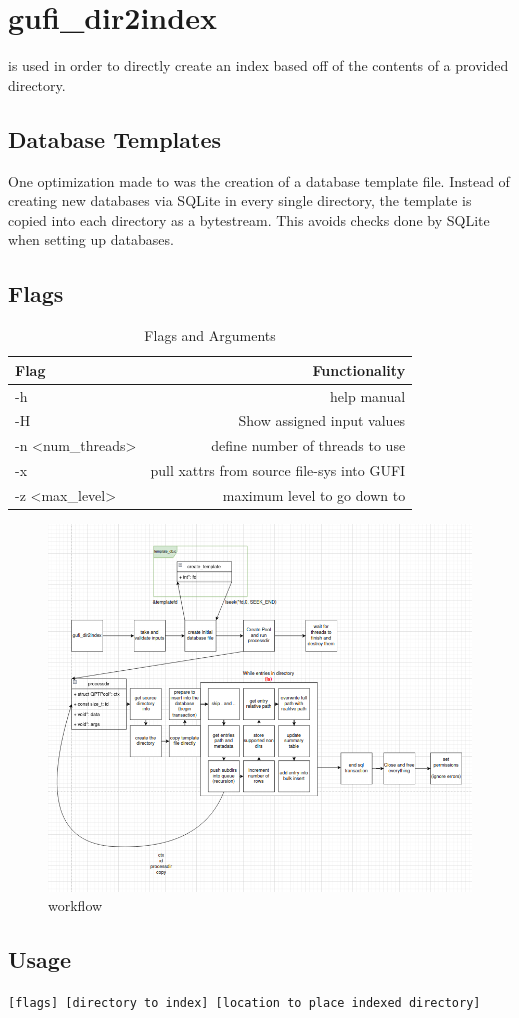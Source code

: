 \section{gufi\_dir2index}
\gufidirindex is used in order to directly create an index based off
of the contents of a provided directory.

\subsection{Database Templates}
One optimization made to \gufidirindex was the creation of a database
template file. Instead of creating new databases via SQLite in every
single directory, the template is copied into each directory as a
bytestream. This avoids checks done by SQLite when setting up databases.

\subsection{Flags}

\begin{table} [h]
  \centering
  \begin{tabular}{l|r}
    Flag & Functionality \\\hline
    -h & help manual \\
    -H & Show assigned input values \\
    -n \textless num\_threads\textgreater  & define number of threads to use \\
    -x & pull xattrs from source file-sys into GUFI \\
    -z \textless max\_level\textgreater & maximum level to go down to
  \end{tabular}
  \caption{\label{fig:Flags_for_dir2index} \gufidirindex Flags and Arguments}
\end{table}

\begin{figure} [h]
  \centering
  \includegraphics[width=1.0\textwidth]{images/gufi_dir2index.png}
  \caption{\label{fig:gufi_dir2index} \gufidirindex workflow}
\end{figure}

\subsection{Usage}
\gufidirindex \texttt{[flags] [directory to index] [location to place indexed directory]}
